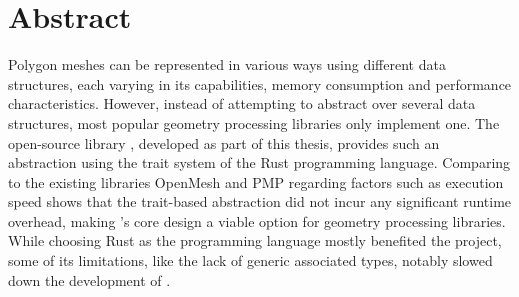 \chapter*{\hfill Abstract}


Polygon meshes can be represented in various ways using different data structures, each varying in its capabilities, memory consumption and performance characteristics.
However, instead of attempting to abstract over several data structures, most popular geometry processing libraries only implement one.
The open-source library , developed as part of this thesis, provides such an abstraction using the trait system of the Rust programming language.
Comparing  to the existing libraries OpenMesh and PMP regarding factors such as execution speed shows that the trait-based abstraction did not incur any significant runtime overhead, making 's core design a viable option for geometry processing libraries.
While choosing Rust as the programming language mostly benefited the project, some of its limitations, like the lack of generic associated types, notably slowed down the development of .




%




















